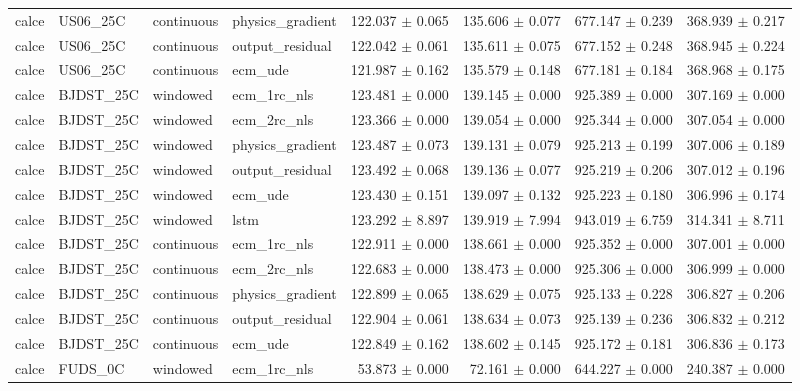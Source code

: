 \begin{longtable}{llllrrrr}
calce & US06\_25C & continuous & physics\_gradient & 122.037 $\pm$ 0.065 & 135.606 $\pm$ 0.077 & 677.147 $\pm$ 0.239 & 368.939 $\pm$ 0.217 \\
calce & US06\_25C & continuous & output\_residual & 122.042 $\pm$ 0.061 & 135.611 $\pm$ 0.075 & 677.152 $\pm$ 0.248 & 368.945 $\pm$ 0.224 \\
calce & US06\_25C & continuous & ecm\_ude & 121.987 $\pm$ 0.162 & 135.579 $\pm$ 0.148 & 677.181 $\pm$ 0.184 & 368.968 $\pm$ 0.175 \\
calce & BJDST\_25C & windowed & ecm\_1rc\_nls & 123.481 $\pm$ 0.000 & 139.145 $\pm$ 0.000 & 925.389 $\pm$ 0.000 & 307.169 $\pm$ 0.000 \\
calce & BJDST\_25C & windowed & ecm\_2rc\_nls & 123.366 $\pm$ 0.000 & 139.054 $\pm$ 0.000 & 925.344 $\pm$ 0.000 & 307.054 $\pm$ 0.000 \\
calce & BJDST\_25C & windowed & physics\_gradient & 123.487 $\pm$ 0.073 & 139.131 $\pm$ 0.079 & 925.213 $\pm$ 0.199 & 307.006 $\pm$ 0.189 \\
calce & BJDST\_25C & windowed & output\_residual & 123.492 $\pm$ 0.068 & 139.136 $\pm$ 0.077 & 925.219 $\pm$ 0.206 & 307.012 $\pm$ 0.196 \\
calce & BJDST\_25C & windowed & ecm\_ude & 123.430 $\pm$ 0.151 & 139.097 $\pm$ 0.132 & 925.223 $\pm$ 0.180 & 306.996 $\pm$ 0.174 \\
calce & BJDST\_25C & windowed & lstm & 123.292 $\pm$ 8.897 & 139.919 $\pm$ 7.994 & 943.019 $\pm$ 6.759 & 314.341 $\pm$ 8.711 \\
calce & BJDST\_25C & continuous & ecm\_1rc\_nls & 122.911 $\pm$ 0.000 & 138.661 $\pm$ 0.000 & 925.352 $\pm$ 0.000 & 307.001 $\pm$ 0.000 \\
calce & BJDST\_25C & continuous & ecm\_2rc\_nls & 122.683 $\pm$ 0.000 & 138.473 $\pm$ 0.000 & 925.306 $\pm$ 0.000 & 306.999 $\pm$ 0.000 \\
calce & BJDST\_25C & continuous & physics\_gradient & 122.899 $\pm$ 0.065 & 138.629 $\pm$ 0.075 & 925.133 $\pm$ 0.228 & 306.827 $\pm$ 0.206 \\
calce & BJDST\_25C & continuous & output\_residual & 122.904 $\pm$ 0.061 & 138.634 $\pm$ 0.073 & 925.139 $\pm$ 0.236 & 306.832 $\pm$ 0.212 \\
calce & BJDST\_25C & continuous & ecm\_ude & 122.849 $\pm$ 0.162 & 138.602 $\pm$ 0.145 & 925.172 $\pm$ 0.181 & 306.836 $\pm$ 0.173 \\
calce & FUDS\_0C & windowed & ecm\_1rc\_nls & 53.873 $\pm$ 0.000 & 72.161 $\pm$ 0.000 & 644.227 $\pm$ 0.000 & 240.387 $\pm$ 0.000 \\

\end{longtable}
